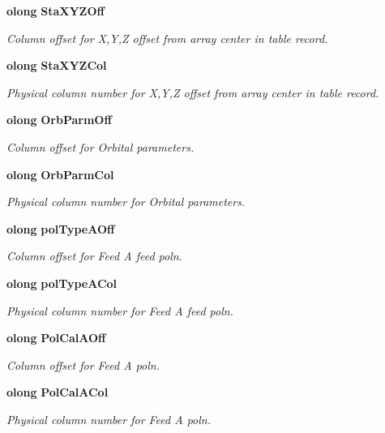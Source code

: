 \begin{CompactItemize}
{\bf olong} {\bf Sta\-XYZOff}
\begin{CompactList}\small\item\em Column offset for X,Y,Z offset from array center in table record. \item\end{CompactList}\item 
{\bf olong} {\bf Sta\-XYZCol}
\begin{CompactList}\small\item\em Physical column number for X,Y,Z offset from array center in table record. \item\end{CompactList}\item 
{\bf olong} {\bf Orb\-Parm\-Off}
\begin{CompactList}\small\item\em Column offset for Orbital parameters. \item\end{CompactList}\item 
{\bf olong} {\bf Orb\-Parm\-Col}
\begin{CompactList}\small\item\em Physical column number for Orbital parameters. \item\end{CompactList}\item 
{\bf olong} {\bf pol\-Type\-AOff}
\begin{CompactList}\small\item\em Column offset for Feed A feed poln. \item\end{CompactList}\item 
{\bf olong} {\bf pol\-Type\-ACol}
\begin{CompactList}\small\item\em Physical column number for Feed A feed poln. \item\end{CompactList}\item 
{\bf olong} {\bf Pol\-Cal\-AOff}
\begin{CompactList}\small\item\em Column offset for Feed A poln. \item\end{CompactList}\item 
{\bf olong} {\bf Pol\-Cal\-ACol}
\begin{CompactList}\small\item\em Physical column number for Feed A poln. \item\end{CompactList}\item 

\end{CompactItemize}
